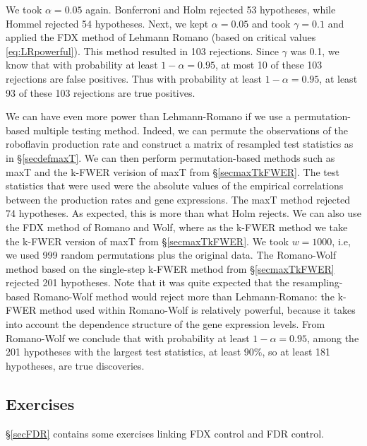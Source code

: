 \documentclass[11pt]{article}
\theoremstyle{plain}
\theoremstyle{definition}
\begin{document}
 We took $\alpha=0.05$ again. Bonferroni and Holm rejected 53 hypotheses, while Hommel rejected 54 hypotheses. Next, we kept $\alpha=0.05$ and took $\gamma=0.1$ and applied the FDX method of Lehmann Romano (based on critical values \eqref{eq:LRpowerful}). This method resulted in 103 rejections. Since $\gamma$ was 0.1, we know that with probability at least $1-\alpha=0.95$, at most 10 of these 103 rejections are false positives. Thus  with probability at least $1-\alpha=0.95$, at least  93 of these 103 rejections are true positives. 
 
 We can have even more power than Lehmann-Romano if we use a permutation-based multiple testing method. Indeed, we can permute the  observations of the roboflavin production rate and construct a matrix of resampled test statistics as in \S\ref{secdefmaxT}. We can then perform permutation-based methods such as maxT and the k-FWER verision of maxT from \S\ref{secmaxTkFWER}. The test statistics that were used were the absolute values of the empirical correlations between the production rates and gene expressions.
  The maxT method rejected 74 hypotheses. As expected, this is more than what Holm rejects.   
 We can also use the FDX method of Romano and Wolf, where as the k-FWER method we take the k-FWER version of maxT from \S\ref{secmaxTkFWER}.  We took $w=1000$, i.e, we used 999 random permutations plus the original data.
 The Romano-Wolf method based on the single-step  k-FWER method from \S\ref{secmaxTkFWER} rejected 201 hypotheses. Note that it was quite expected that the resampling-based Romano-Wolf method would reject more than Lehmann-Romano: the k-FWER method used within Romano-Wolf is relatively powerful, because it takes into account the dependence structure of the gene expression levels.
 From Romano-Wolf we conclude that with probability at least $1-\alpha=0.95$, among the 201 hypotheses with the largest test statistics, at least $90\%$, so at least 181 hypotheses, are true discoveries. 
 

 \subsection{Exercises}
\S\ref{secFDR} contains some exercises linking FDX control and FDR control. 
 
 
 
\end{document}
